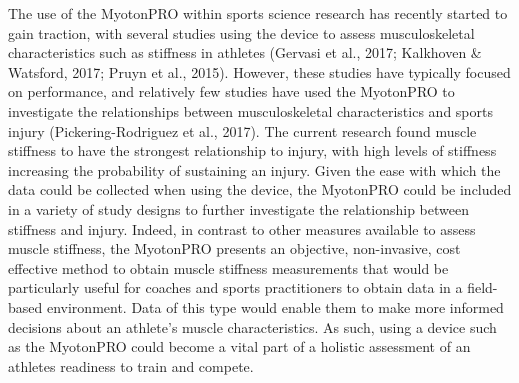 \documentclass[
  english,
  man,floatsintext]{apa6}
\begin{document}
The use of the MyotonPRO within sports science research has recently started to gain traction, with several studies using the device to assess musculoskeletal characteristics such as stiffness in athletes (Gervasi et al., 2017; Kalkhoven \& Watsford, 2017; Pruyn et al., 2015).
However, these studies have typically focused on performance, and relatively few studies have used the MyotonPRO to investigate the relationships between musculoskeletal characteristics and sports injury (Pickering-Rodriguez et al., 2017).
The current research found muscle stiffness to have the strongest relationship to injury, with high levels of stiffness increasing the probability of sustaining an injury.
Given the ease with which the data could be collected when using the device, the MyotonPRO could be included in a variety of study designs to further investigate the relationship between stiffness and injury.
Indeed, in contrast to other measures available to assess muscle stiffness, the MyotonPRO presents an objective, non-invasive, cost effective method to obtain muscle stiffness measurements that would be particularly useful for coaches and sports practitioners to obtain data in a field-based environment.
Data of this type would enable them to make more informed decisions about an athlete's muscle characteristics.
As such, using a device such as the MyotonPRO could become a vital part of a holistic assessment of an athletes readiness to train and compete.
\end{document}
